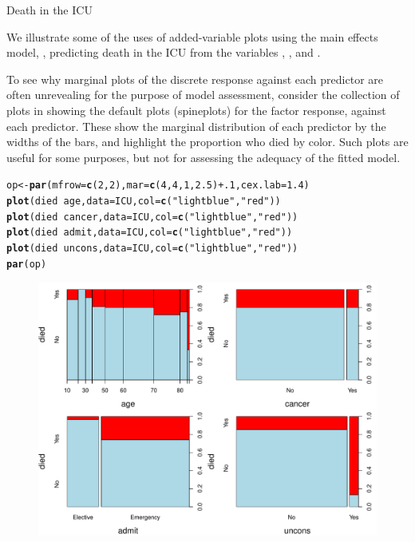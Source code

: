 \documentclass[11pt]{book}\usepackage[]{graphicx}\usepackage[]{color}
\makeatletter
\newcommand{\hlnum}[1]{\textcolor[rgb]{0.686,0.059,0.569}{#1}}%
\newcommand{\hlstr}[1]{\textcolor[rgb]{0.192,0.494,0.8}{#1}}%
\newcommand{\hlopt}[1]{\textcolor[rgb]{0,0,0}{#1}}%
\newcommand{\hlstd}[1]{\textcolor[rgb]{0.345,0.345,0.345}{#1}}%
\newcommand{\hlkwb}[1]{\textcolor[rgb]{0.69,0.353,0.396}{#1}}%
\newcommand{\hlkwc}[1]{\textcolor[rgb]{0.333,0.667,0.333}{#1}}%
\newcommand{\hlkwd}[1]{\textcolor[rgb]{0.737,0.353,0.396}{\textbf{#1}}}%
\newenvironment{kframe}{%
 \def\at@end@of@kframe{}%
 \ifinner\ifhmode%
  \def\at@end@of@kframe{\end{minipage}}%
  \begin{minipage}{\columnwidth}%
 \fi\fi%
 \def\FrameCommand##1{\hskip\@totalleftmargin \hskip-\fboxsep
 \colorbox{shadecolor}{##1}\hskip-\fboxsep
     \hskip-\linewidth \hskip-\@totalleftmargin \hskip\columnwidth}%
 \MakeFramed {\advance\hsize-\width
   \@totalleftmargin\z@ \linewidth\hsize
   \@setminipage}}%
 {\par\unskip\endMakeFramed%
 \at@end@of@kframe}
\newenvironment{knitrout}{}{} %
\renewenvironment{knitrout}{\small\renewcommand{\baselinestretch}{.85}}{} %
\makeatother
\begin{document}
\begin{Example}[icu3]{Death in the ICU}

We illustrate some of the uses of added-variable plots using the main effects model, 
, predicting death in the ICU from the variables
, ,  and .

To see why marginal plots of the discrete response against each predictor are often
unrevealing for the purpose of model assessment, 
consider the collection of plots in 
showing the default plots (spineplots) for the factor response, 
against each predictor. These show the marginal distribution of each predictor
by the widths of the bars, and highlight the proportion who died by color.
Such plots are useful for some purposes, but not for assessing the adequacy of
the fitted model.

\begin{knitrout}
\color{fgcolor}\begin{kframe}
\begin{alltt}
\hlstd{op} \hlkwb{<-} \hlkwd{par}\hlstd{(}\hlkwc{mfrow}\hlstd{=}\hlkwd{c}\hlstd{(}\hlnum{2}\hlstd{,}\hlnum{2}\hlstd{),} \hlkwc{mar}\hlstd{=}\hlkwd{c}\hlstd{(}\hlnum{4}\hlstd{,}\hlnum{4}\hlstd{,}\hlnum{1}\hlstd{,}\hlnum{2.5}\hlstd{)}\hlopt{+}\hlnum{.1}\hlstd{,} \hlkwc{cex.lab}\hlstd{=}\hlnum{1.4}\hlstd{)}
\hlkwd{plot}\hlstd{(died} \hlopt{~} \hlstd{age,} \hlkwc{data}\hlstd{=ICU,} \hlkwc{col}\hlstd{=}\hlkwd{c}\hlstd{(}\hlstr{"lightblue"}\hlstd{,} \hlstr{"red"}\hlstd{))}
\hlkwd{plot}\hlstd{(died} \hlopt{~} \hlstd{cancer,} \hlkwc{data}\hlstd{=ICU,} \hlkwc{col}\hlstd{=}\hlkwd{c}\hlstd{(}\hlstr{"lightblue"}\hlstd{,} \hlstr{"red"}\hlstd{))}
\hlkwd{plot}\hlstd{(died} \hlopt{~} \hlstd{admit,} \hlkwc{data}\hlstd{=ICU,} \hlkwc{col}\hlstd{=}\hlkwd{c}\hlstd{(}\hlstr{"lightblue"}\hlstd{,} \hlstr{"red"}\hlstd{))}
\hlkwd{plot}\hlstd{(died} \hlopt{~} \hlstd{uncons,} \hlkwc{data}\hlstd{=ICU,} \hlkwc{col}\hlstd{=}\hlkwd{c}\hlstd{(}\hlstr{"lightblue"}\hlstd{,} \hlstr{"red"}\hlstd{))}
\hlkwd{par}\hlstd{(op)}
\end{alltt}
\end{kframe}\begin{figure}[!htbp]


\centerline{\includegraphics[width=.8\textwidth]{ch07/fig/icu3-marginal-1} }


\end{figure}
\end{knitrout}
\end{Example}
\end{document}
